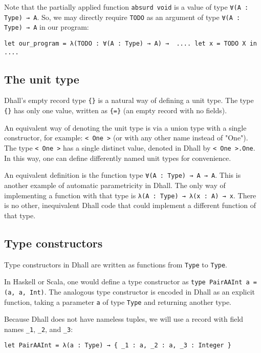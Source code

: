 Note that the partially applied function \lstinline!absurd void! is a value of type \lstinline!∀(A : Type) → A!.
So, we may directly require \lstinline!TODO! as an argument of type \lstinline!∀(A : Type) → A! in our program:


\begin{lstlisting}[language=Dhall]
let our_program = λ(TODO : ∀(A : Type) → A) →  .... let x = TODO X in ....
\end{lstlisting}


\subsection{The unit type}


Dhall's empty record type \lstinline!{}! is a natural way of defining a unit type.
The type \lstinline!{}! has only one value, written as \lstinline!{=}! (an empty record with no fields).


An equivalent way of denoting the unit type is via a union type with a single constructor, for example: \lstinline!< One >! (or with any other name instead of "One").
The type \lstinline!< One >! has a single distinct value, denoted in Dhall by \lstinline!< One >.One!.
In this way, one can define differently named unit types for convenience.


An equivalent definition is the function type \lstinline!∀(A : Type) → A → A!.
This is another example of automatic parametricity in Dhall.
The only way of implementing a function with that type is \lstinline!λ(A : Type) → λ(x : A) → x!.
There is no other, inequivalent Dhall code that could implement a different function of that type.


\subsection{Type constructors}


Type constructors in Dhall are written as functions from \lstinline!Type! to \lstinline!Type!.


In Haskell or Scala, one would define a type constructor as \lstinline!type PairAAInt a = (a, a, Int)!.
The analogous type constructor is encoded in Dhall as an explicit function, taking a parameter \lstinline!a! of type \lstinline!Type! and returning another type.


Because Dhall does not have nameless tuples, we will use a record with field names \lstinline!_1!, \lstinline!_2!, and \lstinline!_3!:


\begin{lstlisting}[language=Dhall]
let PairAAInt = λ(a : Type) → { _1 : a, _2 : a, _3 : Integer }
\end{lstlisting}


